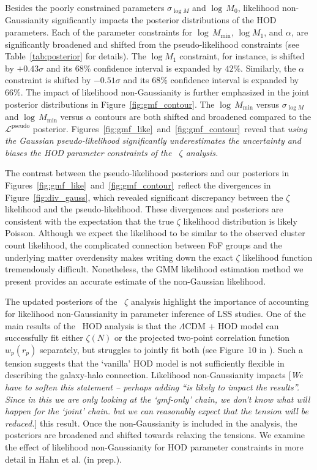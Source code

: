 \documentclass[12pt, letterpaper, preprint]{aastex}
\newcommand{\Sinh}{\citetalias{sinha2017}\xspace}
\newcommand{\ms}[1]{{\color{orange}{\bf MS:}} {[\em #1}]}
\newcommand{\lss}{{\small{LSS}}\xspace}
\newcommand{\gmm}{{\small{GMM}}\xspace}
\begin{document}
Besides the poorly constrained parameters $\sigma_{\log M}$ and $\log\, M_0$, 
likelihood non-Gaussianity significantly impacts the posterior 
distributions of the HOD parameters. Each of the parameter constraints 
for $\log\,M_\mathrm{min}$, $\log M_1$, and $\alpha$, are significantly 
broadened and shifted from the pseudo-likelihood constraints
(see Table~\ref{tab:posterior} for details). The $\log M_1$ constraint, 
for instance, is shifted by $+0.43 \sigma$ and its $68\%$ confidence
interval is expanded by $42\%$. Similarly, the $\alpha$ constraint is
shifted by $-0.51 \sigma$ and its $68\%$ confidence interval is expanded 
by $66\%$. The impact of likelihood non-Gaussianity is further emphasized in 
the joint posterior distributions in Figure~\ref{fig:gmf_contour}.
The $\log\,M_\mathrm{min}$ versus $\sigma_{\log M}$ and 
$\log\,M_\mathrm{min}$ versus $\alpha$ contours are both shifted 
and broadened compared to the $\mathcal{L}^\mathrm{pseudo}$ 
posterior. Figures~\ref{fig:gmf_like}~and~\ref{fig:gmf_contour}~reveal 
that \emph{using the Gaussian pseudo-likelihood significantly 
underestimates the uncertainty and biases the HOD parameter constraints 
of the \Sinh~$\zeta$ analysis.}

The contrast between the pseudo-likelihood posteriors and our posteriors
in Figures~\ref{fig:gmf_like}~and~\ref{fig:gmf_contour}~reflect 
the divergences in Figure~\ref{fig:div_gauss}, which revealed significant
discrepancy between the $\zeta$ likelihood and the pseudo-likelihood. 
These divergences and posteriors are consistent with the expectation 
that the true $\zeta$ likelihood distribution is likely Poisson. Although 
we expect the likelihood to be similar to the observed cluster count likelihood, 
the complicated connection between FoF groups and the underlying 
matter overdensity makes writing down the exact $\zeta$ likelihood function 
tremendously difficult. Nonetheless, the \gmm likelihood estimation method we 
present provides an accurate estimate of the non-Gaussian likelihood. 

The updated posteriors of the \Sinh~$\zeta$ analysis highlight the importance of 
accounting for likelihood non-Gaussianity in parameter inference of 
\lss studies. One of the main results of the \Sinh~HOD analysis 
is that the $\Lambda$CDM + HOD model can successfully 
fit either $\zeta(N)$ or the projected two-point correlation function 
$w_p(r_p)$ separately, but struggles to jointly fit both (see Figure~10 in \Sinh). 
Such a tension suggests that the `vanilla' HOD model is not sufficiently 
flexible in describing the galaxy-halo connection. Likelihood non-Gaussianity
impacts \ms{We have to soften this statement -- perhaps adding ``is likely to
  impact the results''.  Since in this we are only looking at the `gmf-only' chain,
we don't know what will happen for the `joint' chain. but we can reasonably
expect that the tension will be reduced.} this result. Once the non-Gaussianity is included in 
the analysis, the posteriors are broadened and shifted towards 
relaxing the tensions. 
We examine the effect of likelihood non-Gaussianity 
for HOD parameter constraints in more detail in Hahn et al. (in prep.). 
\end{document}
